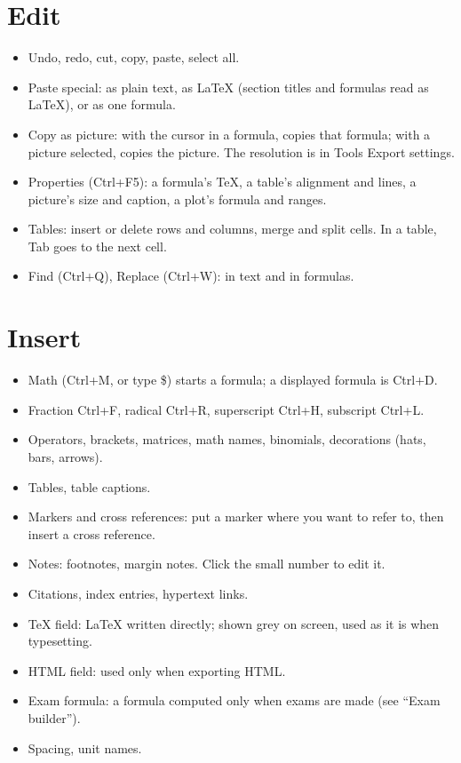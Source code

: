 \section{Edit}

\begin{itemize}
\item Undo, redo, cut, copy, paste, select all.
\item Paste special: as plain text, as LaTeX (section titles and formulas read as LaTeX), or as one formula.
\item Copy as picture: with the cursor in a formula, copies that formula; with a picture selected, copies the picture. The resolution is in Tools \TEXTsymbol{>} Export settings.
\item Properties (Ctrl+F5): a formula's TeX, a table's alignment and lines, a picture's size and caption, a plot's formula and ranges.
\item Tables: insert or delete rows and columns, merge and split cells. In a table, Tab goes to the next cell.
\item Find (Ctrl+Q), Replace (Ctrl+W): in text and in formulas.
\end{itemize}

\section{Insert}

\begin{itemize}
\item Math (Ctrl+M, or type \$) starts a formula; a displayed formula is Ctrl+D.
\item Fraction Ctrl+F, radical Ctrl+R, superscript Ctrl+H, subscript Ctrl+L.
\item Operators, brackets, matrices, math names, binomials, decorations (hats, bars, arrows).
\item Tables, table captions.
\item Markers and cross references: put a marker where you want to refer to, then insert a cross reference.
\item Notes: footnotes, margin notes. Click the small number to edit it.
\item Citations, index entries, hypertext links.
\item TeX field: LaTeX written directly; shown grey on screen, used as it is when typesetting.
\item HTML field: used only when exporting HTML.
\item Exam formula: a formula computed only when exams are made (see ``Exam builder'').
\item Spacing, unit names.
\end{itemize}

